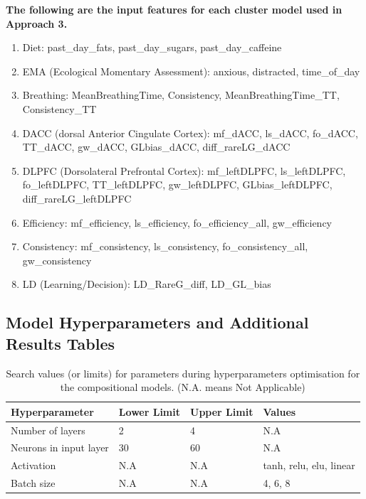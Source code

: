 \textbf{The following are the input features for each cluster model used in Approach 3.}

\begin{enumerate}
    \item Diet: past\_day\_fats, past\_day\_sugars, past\_day\_caffeine
    \item EMA (Ecological Momentary Assessment): anxious, distracted, time\_of\_day
    \item Breathing: MeanBreathingTime, Consistency, MeanBreathingTime\_TT, Consistency\_TT
    \item DACC (dorsal Anterior Cingulate Cortex): mf\_dACC, ls\_dACC, fo\_dACC, TT\_dACC, gw\_dACC, GLbias\_dACC, diff\_rareLG\_dACC
    \item DLPFC (Dorsolateral Prefrontal Cortex): mf\_leftDLPFC, ls\_leftDLPFC, fo\_leftDLPFC, TT\_leftDLPFC, gw\_leftDLPFC, GLbias\_leftDLPFC, diff\_rareLG\_leftDLPFC
    \item Efficiency: mf\_efficiency, ls\_efficiency, fo\_efficiency\_all, gw\_efficiency
    \item Consistency: mf\_consistency, ls\_consistency, fo\_consistency\_all, gw\_consistency
    \item LD (Learning/Decision): LD\_RareG\_diff, LD\_GL\_bias
\end{enumerate}


   
\subsection{Model Hyperparameters and Additional Results Tables}
\begin{table}[H] 
 \caption{Search values (or limits) for parameters during hyperparameters optimisation for the compositional models. (N.A. means Not Applicable)}
 \begin{tabularx}{\textwidth}{RRRR}
 \toprule
 \textbf{Hyperparameter} & \textbf{Lower Limit} & \textbf{Upper Limit} & \textbf{Values}\\
 \midrule
 Number of layers & 2 & 4 & N.A\\
 Neurons in input layer & 30 & 60 & N.A \\
 Activation & N.A & N.A & tanh, relu, elu, linear\\
 Batch size & N.A & N.A & 4, 6, 8 \\
 \bottomrule
 \end{tabularx}
 \label{tab:optimiser_values_compositional}
\end{table}



